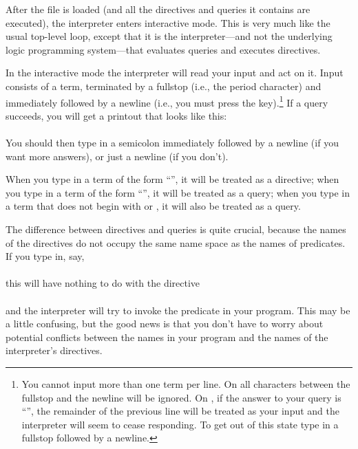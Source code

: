 %

After the file is loaded (and all the directives and queries it contains are
executed), the interpreter enters interactive mode.  This is very much like
the usual top-level loop, except that it is the interpreter---and not the
underlying logic programming system---that evaluates queries and executes
directives.

In the interactive mode the interpreter will read your input and act on it.
Input consists of a term, terminated by a fullstop (i.e., the period
character) and immediately followed by a newline (i.e., you must press the
 key).\footnote{
  You cannot input more than one term per line. On \Sicstus{} all characters
  between the fullstop and the newline will be ignored.  On \Eclipse{}, if the
  answer to your query is ``'', the remainder of the
  previous line will be treated as your input and the interpreter will seem
  to cease responding.  To get out of this state type in a fullstop followed
  by a newline.}
If a query succeeds, you will get a printout that looks like this:\\
\ind{}\\
You should then type in a semicolon immediately followed by a newline (if you
want more answers), or just a newline (if you don't).

When you type in a term of the form ``'', it will be
treated as a directive; when you type in a term of the form
``'', it will be treated as a query; when
you type in a term that does not begin with \prog{:-} or , it will
also be treated as a query.

The difference between directives and queries is quite crucial, because the
names of the directives do not occupy the same name space
as the names of predicates.  If you type in, say,\\
\ind{}\\
this will have nothing to do with the directive\\
\ind{}\\
and the interpreter will try to invoke the predicate  in your
program.  This may be a little confusing, but the good news is that you don't
have to worry about potential conflicts between the names in your program and
the names of the interpreter's directives.

